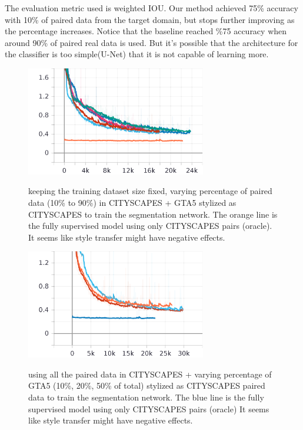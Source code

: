 \documentclass{article}
\begin{document}
The evaluation metric used is weighted IOU. Our method achieved 75\% accuracy with 10\% of paired data from the target domain, but stops further improving as the percentage increases. Notice that the baseline reached \%75 accuracy when around 90\% of paired real data is used. But it's possible that the architecture for the classifier is too simple(U-Net) that it is not capable of learning more.\\

\begin{figure}[H]
    \centering
\includegraphics[width=0.7\textwidth]{figures/realx_base (1).png}\\
\caption{keeping the training dataset size fixed, varying percentage of paired data (10\% to 90\%) in CITYSCAPES + GTA5 stylized as CITYSCAPES to train the segmentation network. The orange line is the fully supervised model using only CITYSCAPES pairs (oracle).  It seems like style transfer might have negative effects.}
\end{figure}


\begin{figure}[H]
    \centering
\includegraphics[width=0.7\textwidth]{figures/real100_and_syn (1).png}\\
\caption{using all the paired data in CITYSCAPES + varying percentage of GTA5 (10\%, 20\%, 50\% of total) stylized as CITYSCAPES paired data to train the segmentation network. The blue line is the fully supervised model using only CITYSCAPES pairs (oracle) It seems like style transfer might have negative effects.}
\end{figure}
\end{document}
